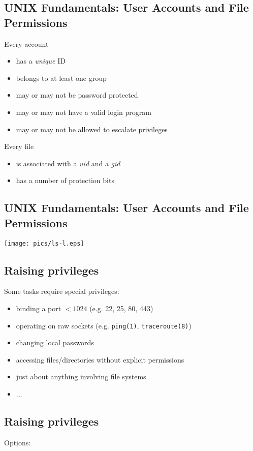 \documentclass[xga]{xdvislides}
\begin{document}
\subsection{UNIX Fundamentals: User Accounts and File Permissions}
Every account
\begin{itemize}
	\item has a {\em unique} ID
	\item belongs to at least one group
	\item may or may not be password protected
	\item may or may not have a valid login program
	\item may or may not be allowed to escalate privileges
\end{itemize}
\addvspace{.5in}
Every file
\begin{itemize}
	\item is associated with a {\em uid} and a {\em gid}
	\item has a number of protection bits
\end{itemize}

\subsection{UNIX Fundamentals: User Accounts and File Permissions}
\vfill
\begin{center}
	\texttt{[image: pics/ls-l.eps]}
\end{center}
\vfill

\subsection{Raising privileges}
Some tasks require special privileges:
\begin{itemize}
	\item binding a port $< 1024$ (e.g. 22, 25, 80, 443)
	\item operating on raw sockets (e.g. {\tt ping(1)}, {\tt traceroute(8)})
	\item changing local passwords
	\item accessing files/directories without explicit permissions
	\item just about anything involving file systems
	\item ...
\end{itemize}

\subsection{Raising privileges}
Options:
\end{document}
